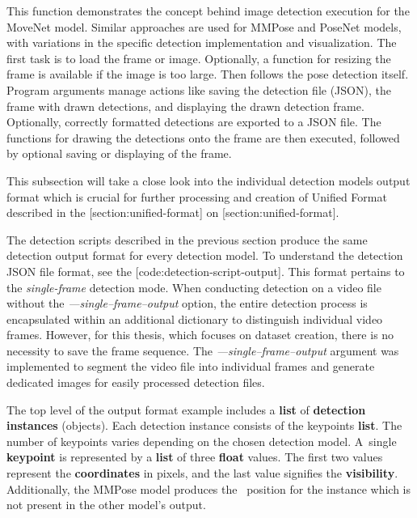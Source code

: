 
This function demonstrates the concept behind image detection execution for the MoveNet model. Similar approaches are used for MMPose and PoseNet models, with variations in the specific detection implementation and visualization. The first task is to load the frame or image. Optionally, a function for resizing the frame is available if the image is too large. Then follows the pose detection itself. Program arguments manage actions like saving the detection file (JSON), the frame with drawn detections, and displaying the drawn detection frame. Optionally, correctly formatted detections are exported to a JSON file. The functions for drawing the detections onto the frame are then executed, followed by optional saving or displaying of the frame. 


This subsection will take a close look into the individual detection models output format which is crucial for further processing and creation of Unified Format described in the [section:unified-format] on [section:unified-format].

The detection scripts described in the previous section produce the same detection output format for every detection model. To understand the detection JSON file format, see the [code:detection-script-output]. This format pertains to the {\em single-frame} detection mode. When conducting detection on a video file without the {\em ---single--frame--output} option, the entire detection process is encapsulated within an additional dictionary to distinguish individual video frames. However, for this thesis, which focuses on dataset creation, there is no necessity to save the frame sequence. The {\em---single--frame--output} argument was implemented to segment the video file into individual frames and generate dedicated images for easily processed detection files.


The top level of the output format example includes a {\bf list} of {\bf detection instances} (objects). Each detection instance consists of the keypoints {\bf list}. The number of keypoints varies depending on the chosen detection model. A~single {\bf keypoint} is represented by a {\bf list} of three {\bf float} values. The first two values represent the {\bf coordinates} in pixels, and the last value signifies the {\bf visibility}. Additionally, the MMPose model produces the \BBOX\ position for the instance which is not present in the other model's output.

